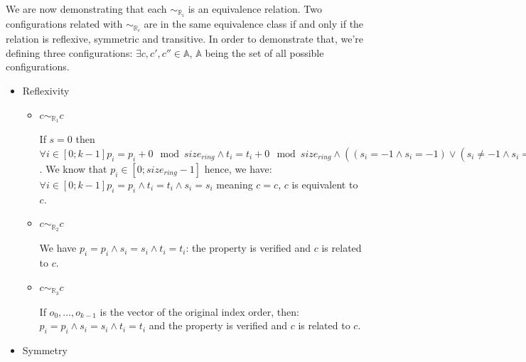\documentclass{article}
\begin{document}
We are now demonstrating that each $\sim_{\mathbb{R}_{i}}$ is an equivalence relation. Two configurations related with $\sim_{\mathbb{R}_{i}}$ are in the same equivalence class if and only if the relation is reflexive, symmetric and transitive. In order to demonstrate that, we're defining three configurations: $\exists c, c', c'' \in \mathbb{A} $, $\mathbb{A}$ being the set of all possible configurations.
\begin{itemize}
    \item Reflexivity
    \begin{itemize}

        \item \begin{center} $c\sim_{\mathbb{R}_{1}}c$ \end{center}
        If $s = 0$ then $\forall i \in [0; k-1] p_{i} = p_{i} + 0 \mod{size_{ring}} \land t_{i} = t_{i} + 0 \mod{size_{ring}} \land  ( (s_{i} = -1 \land s_{i} = -1) \lor  (s_{i} \not= -1 \land s_{i} = s_{i} + 0 \mod{size_{ring}}))$. We know that $p_{i} \in [0; size_{ring}-1]$ hence, we have: $\forall i \in [0; k-1] p_{i} = p_{i} \land t_{i} = t_{i} \land s_{i} = s_{i}$ meaning $c = c$, $c$ is equivalent to $c$.
        
        \item \begin{center} $c\sim_{\mathbb{R}_{2}}c$\end{center}
        We have $p_{i} = p_{i} \land s_{i} = s_{i} \land t_{i} = t_{i}$: the property is verified and $c$ is related to $c$.

        \item \begin{center} $c\sim_{\mathbb{R}_{3}}c$\end{center}
        If $o_{0},\dots, o_{k-1}$ is the vector of the original index order, then: $p_{i} = p_{i} \land s_{i} = s_{i} \land t_{i} = t_{i}$ and the property is verified and $c$ is related to $c$.
        
    \end{itemize}
    \item Symmetry
    \begin{itemize}


\end{itemize}
\end{itemize}
\end{document}

